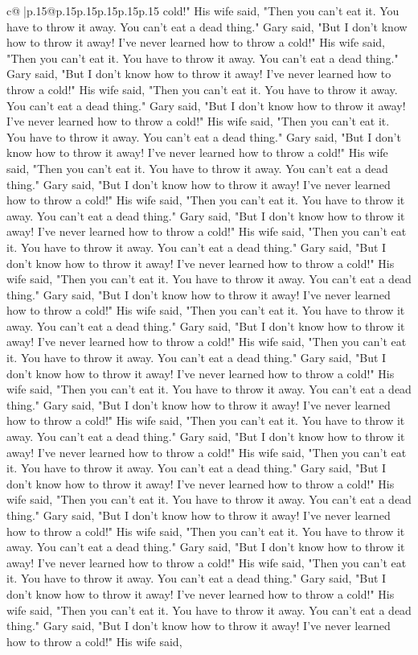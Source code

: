 \documentclass{article}
\begin{document}
{\begin{supertabular}{c@{$\;$}|p{.15\linewidth}@{}p{.15\linewidth}p{.15\linewidth}p{.15\linewidth}p{.15\linewidth}p{.15\linewidth}}
{{{cold!" His wife said, "Then you can't eat it. You have to throw it away. You can't eat a dead thing." Gary said, "But I don't know how to throw it away! I've never learned how to throw a cold!" His wife said, "Then you can't eat it. You have to throw it away. You can't eat a dead thing." Gary said, "But I don't know how to throw it away! I've never learned how to throw a cold!" His wife said, "Then you can't eat it. You have to throw it away. You can't eat a dead thing." Gary said, "But I don't know how to throw it away! I've never learned how to throw a cold!" His wife said, "Then you can't eat it. You have to throw it away. You can't eat a dead thing." Gary said, "But I don't know how to throw it away! I've never learned how to throw a cold!" His wife said, "Then you can't eat it. You have to throw it away. You can't eat a dead thing." Gary said, "But I don't know how to throw it away! I've never learned how to throw a cold!" His wife said, "Then you can't eat it. You have to throw it away. You can't eat a dead thing." Gary said, "But I don't know how to throw it away! I've never learned how to throw a cold!" His wife said, "Then you can't eat it. You have to throw it away. You can't eat a dead thing." Gary said, "But I don't know how to throw it away! I've never learned how to throw a cold!" His wife said, "Then you can't eat it. You have to throw it away. You can't eat a dead thing." Gary said, "But I don't know how to throw it away! I've never learned how to throw a cold!" His wife said, "Then you can't eat it. You have to throw it away. You can't eat a dead thing." Gary said, "But I don't know how to throw it away! I've never learned how to throw a cold!" His wife said, "Then you can't eat it. You have to throw it away. You can't eat a dead thing." Gary said, "But I don't know how to throw it away! I've never learned how to throw a cold!" His wife said, "Then you can't eat it. You have to throw it away. You can't eat a dead thing." Gary said, "But I don't know how to throw it away! I've never learned how to throw a cold!" His wife said, "Then you can't eat it. You have to throw it away. You can't eat a dead thing." Gary said, "But I don't know how to throw it away! I've never learned how to throw a cold!" His wife said, "Then you can't eat it. You have to throw it away. You can't eat a dead thing." Gary said, "But I don't know how to throw it away! I've never learned how to throw a cold!" His wife said, "Then you can't eat it. You have to throw it away. You can't eat a dead thing." Gary said, "But I don't know how to throw it away! I've never learned how to throw a cold!" His wife said, "Then you can't eat it. You have to throw it away. You can't eat a dead thing." Gary said, "But I don't know how to throw it away! I've never learned how to throw a cold!" His wife said, "Then you can't eat it. You have to throw it away. You can't eat a dead thing." Gary said, "But I don't know how to throw it away! I've never learned how to throw a cold!" His wife said, "Then you can't eat it. You have to throw it away. You can't eat a dead thing." Gary said, "But I don't know how to throw it away! I've never learned how to throw a cold!" His wife said, }}}
\end{supertabular}}
\end{document}
